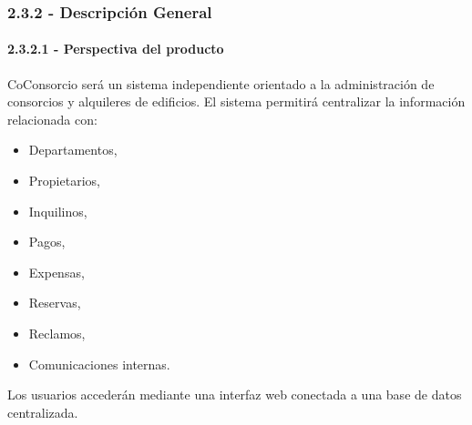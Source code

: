 \subsubsection{2.3.2 - Descripción General}

\paragraph{2.3.2.1 - Perspectiva del producto}
CoConsorcio será un sistema independiente orientado a la administración de consorcios y alquileres de edificios.  
El sistema permitirá centralizar la información relacionada con:
\begin{itemize}
    \item Departamentos,   
    \item Propietarios,   
    \item Inquilinos,   
    \item Pagos,   
    \item Expensas,   
    \item Reservas,   
    \item Reclamos,   
    \item Comunicaciones internas. 
\end{itemize}

Los usuarios accederán mediante una interfaz web conectada a una base de datos centralizada.
